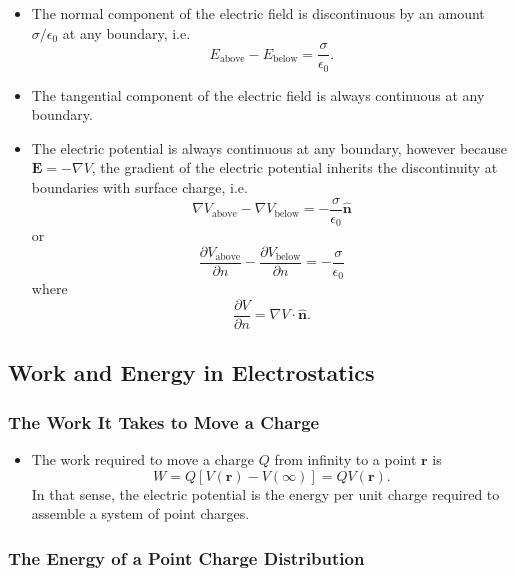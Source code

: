 \documentclass{article}
\renewcommand{\vec}[1]{\boldsymbol{\mathbf{#1}}}
\newcommand{\uvec}[1]{\hat{\vec{#1}}}
\begin{document}
\begin{itemize}
  \item The normal component of the electric field is discontinuous by an amount $\sigma / \epsilon_0$ at any boundary, i.e. \[E_\text{above} - E_\text{below} = \frac{\sigma}{\epsilon_0}.\]

  \item The tangential component of the electric field is always continuous at any boundary.

  \item The electric potential is always continuous at any boundary, however because $\vec{E} = -\nabla V$, the gradient of the electric potential inherits the discontinuity at boundaries with surface charge, i.e. \[\nabla V_\text{above} - \nabla V_\text{below} = -\frac{\sigma}{\epsilon_0} \uvec{n}\] or \[\frac{\partial V_\text{above}}{\partial n} - \frac{\partial V_\text{below}}{\partial n} = -\frac{\sigma}{\epsilon_0}\] where \[\frac{\partial V}{\partial n} = \nabla V \cdot \uvec{n}.\]
\end{itemize}

\subsection{Work and Energy in Electrostatics}

\subsubsection{The Work It Takes to Move a Charge}

\begin{itemize}
  \item The work required to move a charge $Q$ from infinity to a point $\vec{r}$ is \[W = Q [V(\vec{r}) - V(\infty)] = Q V(\vec{r}).\] In that sense, the electric potential is the energy per unit charge required to assemble a system of point charges.
\end{itemize}

\subsubsection{The Energy of a Point Charge Distribution}
\end{document}
